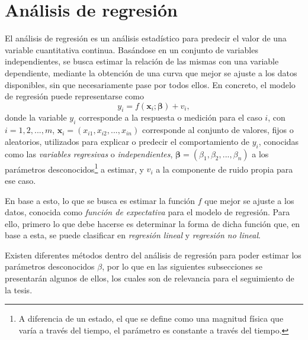\section{Análisis de regresión}
\label{sec:regressionanalysis}
El análisis de regresión es un análisis estadístico para predecir el valor de una variable cuantitativa continua. Basándose en un conjunto de variables independientes, se busca estimar la relación de las mismas con una variable dependiente, mediante la obtención de una curva que mejor se ajuste a los datos disponibles, sin que necesariamente pase por todos ellos. En concreto, el modelo de regresión puede representarse como \cite{montgomery2012}
\begin{equation}
    y_i = f(\bm{x}_i; \bm{\beta}) + v_i,
    \label{eq:regressionmodel}
\end{equation}
donde la variable $y_i$ corresponde a la respuesta o medición para el caso $i$, con $i = 1, 2, ..., m$, $\bm{x}_i = (x_{i1}, x_{i2}, ..., x_{in})$ corresponde al conjunto de valores, fijos o aleatorios, utilizados para explicar o predecir el comportamiento de $y_i$, conocidas como las \textit{variables regresivas} o \textit{independientes}, $\bm{\beta} = (\beta_1, \beta_2, ..., \beta_n)$ a los parámetros desconocidos\footnote{A diferencia de un estado, el que se define como una magnitud física que varía a través del tiempo, el parámetro es constante a través del tiempo.} a estimar, y $v_i$ a la componente de ruido propia para ese caso.

En base a esto, lo que se busca es estimar la función $f$ que mejor se ajuste a los datos, conocida como \textit{función de expectativa} para el modelo de regresión. Para ello, primero lo que debe hacerse es determinar la forma de dicha función que, en base a esta, se puede clasificar en \textit{regresión lineal} y \textit{regresión no lineal}.

Existen diferentes métodos dentro del análisis de regresión para poder estimar los parámetros desconocidos $\beta$, por lo que en las siguientes subsecciones se presentarán algunos de ellos, los cuales son de relevancia para el seguimiento de la tesis.


